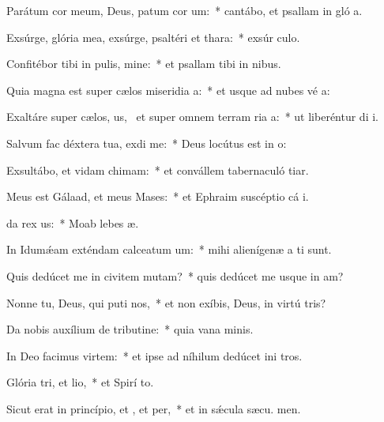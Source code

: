 \item Parátum cor meum, Deus, patum cor um:~* cantábo, et psallam in gló a.
\item Exsúrge, glória mea, exsúrge, psaltéri et thara:~* exsúr culo.
\item Confitébor tibi in pulis, mine:~* et psallam tibi in nibus.
\item Quia magna est super cælos miseridia a:~* et usque ad nubes vé a:
\item Exaltáre super cælos, us,~\pscross{} et super omnem terram ria a:~* ut liberéntur di i.
\item Salvum fac déxtera tua,  exdi me:~* Deus locútus est in  o:
\item Exsultábo, et vidam chimam:~* et convállem tabernaculó tiar.
\item Meus est Gálaad, et meus  Mases:~* et Ephraim suscéptio cá i.
\item {}da rex us:~* Moab lebes  æ.
\item In Idumǽam exténdam calceatum um:~* mihi alienígenæ a ti sunt.
\item Quis dedúcet me in civitem mutam?~* quis dedúcet me usque in am?
\item Nonne tu, Deus, qui puti nos,~* et non exíbis, Deus, in virtú tris?
\item Da nobis auxílium de tributine:~* quia vana  minis.
\item In Deo facimus virtem:~* et ipse ad níhilum dedúcet ini tros.
\item Glória tri, et lio,~* et Spirí to.
\item Sicut erat in princípio, et , et per,~* et in sǽcula sæcu. men.
